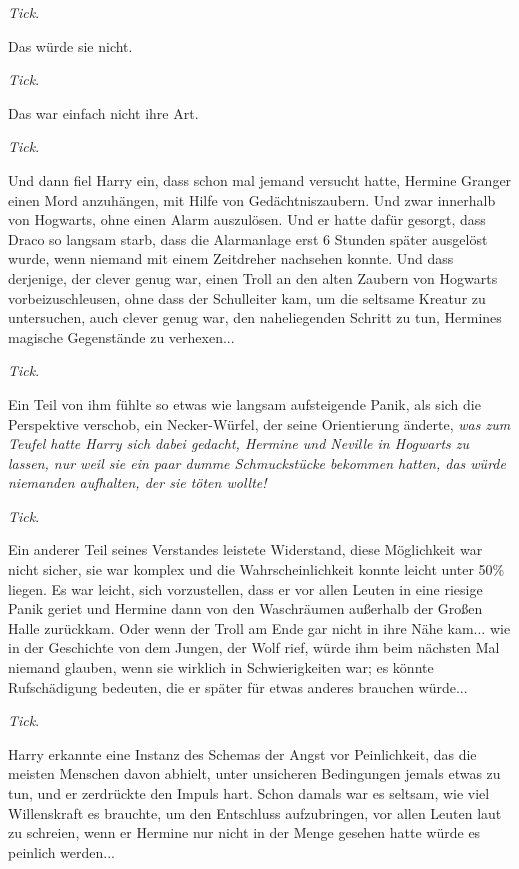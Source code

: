 \emph{Tick}.

Das würde sie nicht.

\emph{Tick}.

Das war einfach nicht ihre Art.

\emph{Tick}.

Und dann fiel Harry ein, dass schon mal jemand versucht hatte, Hermine Granger
einen Mord anzuhängen, mit Hilfe von Gedächtniszaubern. Und zwar innerhalb von
Hogwarts, ohne einen Alarm auszulösen. Und er hatte dafür gesorgt, dass Draco so
langsam starb, dass die Alarmanlage erst 6 Stunden später ausgelöst wurde, wenn
niemand mit einem Zeitdreher nachsehen konnte. Und dass derjenige, der clever
genug war, einen Troll an den alten Zaubern von Hogwarts vorbeizuschleusen, ohne
dass der Schulleiter kam, um die seltsame Kreatur zu untersuchen, auch clever
genug war, den naheliegenden Schritt zu tun, Hermines magische Gegenstände zu
verhexen...

\emph{Tick}.

Ein Teil von ihm fühlte so etwas wie langsam aufsteigende Panik, als sich die
Perspektive verschob, ein Necker-Würfel, der seine Orientierung änderte,
\emph{was zum Teufel hatte Harry sich dabei gedacht, Hermine und Neville in
Hogwarts zu lassen, nur weil sie ein paar dumme Schmuckstücke bekommen hatten,
das würde niemanden aufhalten, der sie töten wollte!}

\emph{Tick}.

Ein anderer Teil seines Verstandes leistete Widerstand, diese Möglichkeit war
nicht sicher, sie war komplex und die Wahrscheinlichkeit konnte leicht unter
50\% liegen. Es war leicht, sich vorzustellen, dass er vor allen Leuten in eine
riesige Panik geriet und Hermine dann von den Waschräumen außerhalb der Großen
Halle zurückkam. Oder wenn der Troll am Ende gar nicht in ihre Nähe kam... wie
in der Geschichte von dem Jungen, der Wolf rief, würde ihm beim nächsten Mal
niemand glauben, wenn sie wirklich in Schwierigkeiten war; es könnte
Rufschädigung bedeuten, die er später für etwas anderes brauchen würde...

\emph{Tick}.

Harry erkannte eine Instanz des Schemas der Angst vor Peinlichkeit, das die
meisten Menschen davon abhielt, unter unsicheren Bedingungen jemals etwas zu
tun, und er zerdrückte den Impuls hart. Schon damals war es seltsam, wie viel
Willenskraft es brauchte, um den Entschluss aufzubringen, vor allen Leuten laut
zu schreien, wenn er Hermine nur nicht in der Menge gesehen hatte würde es
peinlich werden...

